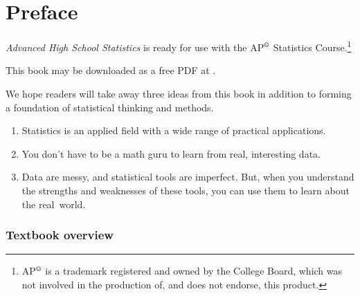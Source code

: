 \chapter*{Preface\vspace{-6mm}}

\emph{Advanced High School Statistics} is ready for use with the AP$^{\text{\textregistered}}$ Statistics Course.\footnote{AP$^{\text{\textregistered}}$ is a trademark registered and owned by the College Board, which was not involved in the production of, and does not endorse, this product.}
\vspace{3mm}

\noindent 
This book may be downloaded as a free PDF at .
\vspace{3mm}

\noindent We hope readers will take away three ideas from this book in addition to forming a foundation of statistical thinking and methods.\vspace{-1mm}
\begin{enumerate}
\setlength{\itemsep}{0mm}
\item[(1)] Statistics is an applied field with a wide range of practical applications.
\item[(2)] You don't have to be a math guru to learn from real, interesting data.
\item[(3)] Data are messy, and statistical tools are imperfect. But, when you understand the strengths and weaknesses of these tools, you can use them to learn about the real~world.
\end{enumerate}


\subsection*{Textbook overview}

